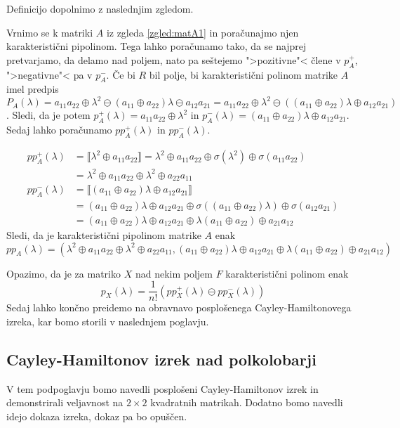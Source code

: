 \documentclass[mat1]{fmfdelo}
\begin{document}
Definicijo dopolnimo z naslednjim zgledom.

\begin{zgled}\label{zgled:matA2}
Vrnimo se k matriki $A$ iz zgleda \ref{zgled:matA1} in poračunajmo njen karakteristični pipolinom. Tega lahko poračunamo tako, da se najprej pretvarjamo, da delamo nad poljem, nato pa seštejemo ">pozitivne"< člene v $p_A^{+}$, ">negativne"< pa v $p_A^{-}$.
Če bi $R$ bil polje, bi karakteristični polinom matrike $A$ imel predpis $P_A(\lambda) = a_{11}a_{22} \oplus \lambda^2 \ominus (a_{11} \oplus a_{22})\lambda \ominus a_{12}a_{21} = a_{11}a_{22} \oplus \lambda^2 \ominus ((a_{11} \oplus a_{22})\lambda \oplus a_{12}a_{21})$. Sledi, da je potem $p_A^{+}(\lambda) = a_{11}a_{22} \oplus \lambda^2$ in $p_A^{-}(\lambda) = (a_{11} \oplus a_{22})\lambda \oplus a_{12}a_{21}$. Sedaj lahko poračunamo $pp_A^{+}(\lambda)$ in $pp_A^{-}(\lambda)$.

\begin{align*}
	pp_A^{+}(\lambda) &= \llbracket \lambda^2 \oplus a_{11}a_{22}\rrbracket = \lambda^2 \oplus a_{11}a_{22} \oplus \sigma(\lambda^2) \oplus \sigma(a_{11}a_{22}) \\ 
	&= \lambda^2 \oplus a_{11}a_{22} \oplus \lambda^2 \oplus a_{22}a_{11} \\
	pp_A^{-}(\lambda) &= \llbracket (a_{11} \oplus a_{22})\lambda \oplus a_{12}a_{21}\rrbracket \\ &= (a_{11} \oplus a_{22})\lambda \oplus a_{12}a_{21} \oplus \sigma((a_{11} \oplus a_{22})\lambda) \oplus \sigma(a_{12}a_{21}) \\ 
	&= (a_{11} \oplus a_{22})\lambda \oplus a_{12}a_{21} \oplus \lambda(a_{11} \oplus a_{22}) \oplus a_{21}a_{12}
\end{align*}
Sledi, da je karakteristični pipolinom matrike $A$ enak $$pp_A(\lambda)= (\lambda^2 \oplus a_{11}a_{22} \oplus \lambda^2 \oplus a_{22}a_{11}, (a_{11} \oplus a_{22})\lambda \oplus a_{12}a_{21} \oplus \lambda(a_{11} \oplus a_{22}) \oplus a_{21}a_{12})$$
\end{zgled}

Opazimo, da je za matriko $X$ nad nekim poljem $F$ karakteristični polinom enak $$p_X(\lambda) = \frac{1}{n!}(pp_X^{+}(\lambda) \ominus pp_X^{-}(\lambda))$$ Sedaj lahko končno preidemo na obravnavo posplošenega Cayley-Hamiltonovega izreka, kar bomo storili v naslednjem poglavju.

\subsection{Cayley-Hamiltonov izrek nad polkolobarji} \label{subsect:CHTtheorem}
V tem podpoglavju bomo navedli posplošeni Cayley-Hamiltonov izrek in demonstrirali veljavnost na $2\times 2$ kvadratnih matrikah. Dodatno bomo navedli idejo dokaza izreka, dokaz pa bo opuščen.
\end{document}
